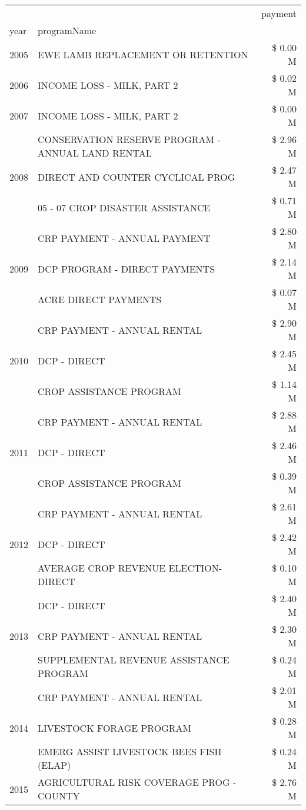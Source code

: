 \begin{tabular}{llr}
\toprule
 &  & payment \\
year & programName &  \\
\midrule
2005 & EWE LAMB REPLACEMENT OR RETENTION & \$ 0.00 M \\
\cline{1-3}
2006 & INCOME LOSS - MILK, PART 2 & \$ 0.02 M \\
\cline{1-3}
2007 & INCOME LOSS - MILK, PART 2 & \$ 0.00 M \\
\cline{1-3}
\multirow[t]{3}{*}{2008} & CONSERVATION RESERVE PROGRAM - ANNUAL LAND RENTAL & \$ 2.96 M \\
 & DIRECT AND COUNTER CYCLICAL PROG & \$ 2.47 M \\
 & 05 - 07 CROP DISASTER ASSISTANCE & \$ 0.71 M \\
\cline{1-3}
\multirow[t]{3}{*}{2009} & CRP PAYMENT - ANNUAL PAYMENT & \$ 2.80 M \\
 & DCP PROGRAM - DIRECT PAYMENTS & \$ 2.14 M \\
 & ACRE DIRECT PAYMENTS & \$ 0.07 M \\
\cline{1-3}
\multirow[t]{3}{*}{2010} & CRP PAYMENT - ANNUAL RENTAL & \$ 2.90 M \\
 & DCP - DIRECT & \$ 2.45 M \\
 & CROP ASSISTANCE PROGRAM & \$ 1.14 M \\
\cline{1-3}
\multirow[t]{3}{*}{2011} & CRP PAYMENT - ANNUAL RENTAL & \$ 2.88 M \\
 & DCP - DIRECT & \$ 2.46 M \\
 & CROP ASSISTANCE PROGRAM & \$ 0.39 M \\
\cline{1-3}
\multirow[t]{3}{*}{2012} & CRP PAYMENT - ANNUAL RENTAL & \$ 2.61 M \\
 & DCP - DIRECT & \$ 2.42 M \\
 & AVERAGE CROP REVENUE ELECTION-DIRECT & \$ 0.10 M \\
\cline{1-3}
\multirow[t]{3}{*}{2013} & DCP - DIRECT & \$ 2.40 M \\
 & CRP PAYMENT - ANNUAL RENTAL & \$ 2.30 M \\
 & SUPPLEMENTAL REVENUE ASSISTANCE PROGRAM & \$ 0.24 M \\
\cline{1-3}
\multirow[t]{3}{*}{2014} & CRP PAYMENT - ANNUAL RENTAL & \$ 2.01 M \\
 & LIVESTOCK FORAGE PROGRAM & \$ 0.28 M \\
 & EMERG ASSIST LIVESTOCK BEES FISH (ELAP) & \$ 0.24 M \\
\cline{1-3}
\multirow[t]{3}{*}{2015} & AGRICULTURAL RISK COVERAGE PROG - COUNTY & \$ 2.76 M \\

\end{tabular}
